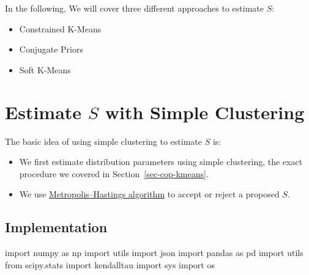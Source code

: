 \documentclass[
  letterpaper,
  DIV=11,
  numbers=noendperiod]{scrreprt}
\newenvironment{Shaded}{\begin{snugshade}}{\end{snugshade}}
\newcommand{\ImportTok}[1]{\textcolor[rgb]{0.00,0.46,0.62}{#1}}
\newcommand{\NormalTok}[1]{\textcolor[rgb]{0.00,0.23,0.31}{#1}}
\providecommand{\tightlist}{%
  \setlength{\itemsep}{0pt}\setlength{\parskip}{0pt}}\usepackage{longtable,booktabs,array}
\begin{document}
In the following, We will cover three different approaches to estimate
\(S\):

\begin{itemize}
\tightlist
\item
  Constrained K-Means
\item
  Conjugate Priors
\item
  Soft K-Means
\end{itemize}


\chapter{\texorpdfstring{Estimate \(S\) with Simple
Clustering}{Estimate S with Simple Clustering}}\label{sec-estS-cop-kmeans}

The basic idea of using simple clustering to estimate \(S\) is:

\begin{itemize}
\tightlist
\item
  We first estimate distribution parameters using simple clustering, the
  exact procedure we covered in Section~\ref{sec-cop-kmeans}.
\item
  We use
  \href{https://en.wikipedia.org/wiki/Metropolis\%E2\%80\%93Hastings_algorithm}{Metropolis--Hastings
  algorithm} to accept or reject a proposed \(S\).
\end{itemize}

\section{Implementation}\label{implementation-1}

\begin{Shaded}
\begin{Highlighting}[]
\ImportTok{import}\NormalTok{ numpy }\ImportTok{as}\NormalTok{ np }
\ImportTok{import}\NormalTok{ utils }
\ImportTok{import}\NormalTok{ json }
\ImportTok{import}\NormalTok{ pandas }\ImportTok{as}\NormalTok{ pd }
\ImportTok{import}\NormalTok{ utils }
\ImportTok{from}\NormalTok{ scipy.stats }\ImportTok{import}\NormalTok{ kendalltau}
\ImportTok{import}\NormalTok{ sys}
\ImportTok{import}\NormalTok{ os}
\end{Highlighting}
\end{Shaded}
\end{document}
